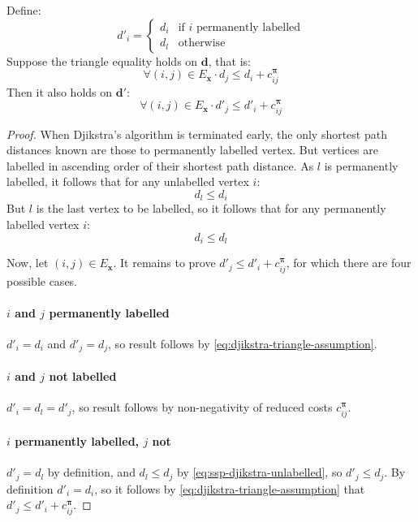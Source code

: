 \begin{lemma} \label{lemma:ssp-preserve-triangle}
    Define:
    \[
    d'_{i}=\begin{cases}
    d_{i} & \text{if $i$ permanently labelled}\\
    d_{l} & \text{otherwise}
    \end{cases}
    \]
    Suppose the triangle equality holds on $\mathbf{d}$, that is:
    \begin{equation} \label{eq:djikstra-triangle-assumption}
    \forall(i,j)\in E_{\mathbf{x}}\cdot d_j \leq d_i + c^{\boldsymbol{\pi}}_{ij}
    \end{equation}
    Then it also holds on $\mathbf{d}'$:
    \[\forall(i,j)\in E_{\mathbf{x}}\cdot d'_j \leq d'_i + c^{\boldsymbol{\pi}}_{ij}\]
\end{lemma}
\begin{proof}
    When Djikstra's algorithm is terminated early, the only shortest path distances known are those to permanently labelled vertex. But vertices are labelled in ascending order of their shortest path distance. As $l$ is permanently labelled, it follows that for any unlabelled vertex $i$:
    \begin{equation} \label{eq:ssp-djikstra-unlabelled}
    d_l \leq d_i
    \end{equation}
    But $l$ is the last vertex to be labelled, so it follows that for any permanently labelled vertex $i$:
    \begin{equation} \label{eq:ssp-djikstra-labelled}
    d_i \leq d_l
    \end{equation}
    
    Now, let $(i,j) \in E_{\mathbf{x}}$. It remains to prove $d'_j \leq d'_i + c^{\boldsymbol{\pi}}_{ij}$, for which there are four possible cases.
    
    \paragraph{$i$ and $j$ permanently labelled} $d'_i = d_i$ and $d'_j = d_j$, so result follows by \cref{eq:djikstra-triangle-assumption}.
    
    \paragraph{$i$ and $j$ not labelled} $d'_i = d_l = d'_j$, so result follows by non-negativity of reduced costs $c^{\boldsymbol{\pi}}_{ij}$.
    
    \paragraph{$i$ permanently labelled, $j$ not} $d'_j = d_l$ by definition, and $d_l \leq d_j$ by \cref{eq:ssp-djikstra-unlabelled}, so $d'_j \leq d_j$. By definition $d'_i = d_i$, so it follows by \cref{eq:djikstra-triangle-assumption} that $d'_j \leq d'_i + c^{\boldsymbol{\pi}}_{ij}$.
    

\end{proof}
